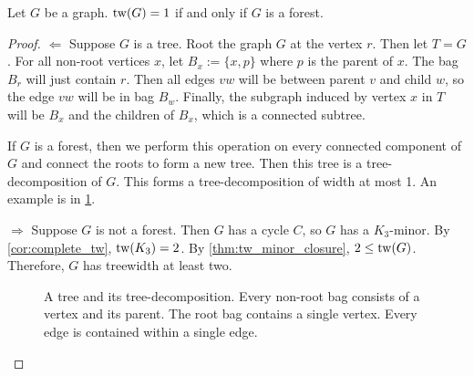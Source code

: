 \begin{proposition}\label{lem:treewidth_forest}
	Let $G$ be a graph. \(\operatorname{tw}(G) = 1\) if and only if \(G\) is a forest.
\end{proposition}

\begin{proof}
	$\Leftarrow$ Suppose \(G\) is a tree. Root the graph \(G\) at the vertex \(r\). Then let \(T = G\). For all non-root vertices $x$, let \(B_x:= \lbrace x, p \rbrace\) where \(p\) is the parent of \(x\). The bag \(B_r\) will just contain \(r\). Then all edges \(vw\) will be between parent \(v\) and child \(w\), so the edge $vw$ will be in bag \(B_w\). Finally, the subgraph induced by vertex \(x\) in \(T\) will be \(B_x\) and the children of \(B_x\), which is a connected subtree.
	\par
	If \(G\) is a forest, then we perform this operation on every connected component of \(G\) and connect the roots to form a new tree. Then this tree is a tree-decomposition of $G$. This forms a tree-decomposition of width at most 1. An example is in \cref{fig:tree-treedecomp}.
	\par
	$\Rightarrow$ Suppose $G$ is not a forest. Then \(G\) has a cycle \(C\), so $G$ has a $K_3$-minor. By \cref{cor:complete_tw}, $\operatorname{tw}(K_3) = 2$. By \cref{thm:tw_minor_closure}, $2 \leq \operatorname{tw}(G)$. Therefore, $G$ has treewidth at least two. 
	\begin{figure}[ht]
		\centering
		
		
		\caption[Tree-Decomposition of a tree]{A tree and its tree-decomposition. Every non-root bag consists of a vertex and its parent. The root bag contains a single vertex. Every edge is contained within a single edge.}\label{fig:tree-treedecomp}
	\end{figure}
\end{proof}

